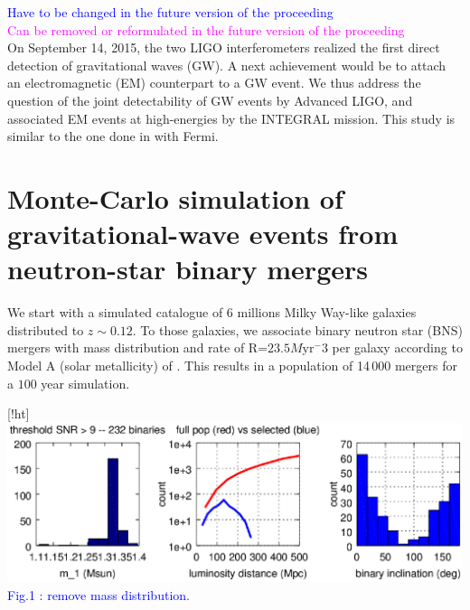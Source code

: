 \documentclass[11pt]{article}
\begin{document}
\textcolor{blue}{Have to be changed in the future version of the proceeding} \\
\textcolor{magenta}{Can be removed or reformulated in the future version of the proceeding} \\
 


On September 14, 2015, the two LIGO interferometers realized the first direct detection of
gravitational waves (GW). A next achievement would be to attach an electromagnetic (EM)
counterpart to a GW event. We thus address the question of the joint detectability 
of GW events by Advanced LIGO, and associated EM events at high-energies by the 
INTEGRAL mission. This study is similar to the one done in \citep{2016arXiv160606124P} with Fermi.

\section*{Monte-Carlo simulation of gravitational-wave events from neutron-star binary mergers}

We start with a simulated catalogue of 6 millions Milky Way-like galaxies
distributed to $z\sim 0.12$. To those galaxies, we associate binary neutron star
(BNS) mergers with mass distribution and rate of R=$23.5 M\mathrm{yr}^-3$ per galaxy
according to Model A (solar metallicity) of
\citep{2012ApJ...759...52D}. This results in a population of 14\,000
mergers for a $100$ year simulation.

\begin{center}[!ht]
   \includegraphics[scale=.7]{P7-1_f1.eps}
   \textcolor{blue}{Fig.1 : remove mass distribution.}
\end{center}
\end{document}
